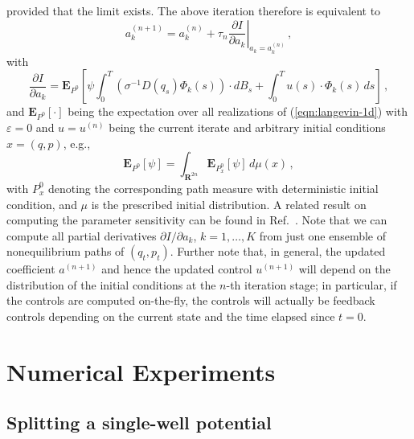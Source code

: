 \documentclass[]{tMPH2e}
\newcommand{\R}{{\mathbf R}}
\newcommand{\eps}{\varepsilon}
\newcommand{\bE}{{\mathbf E}}
\begin{document}
provided that the limit exists. The above iteration therefore is equivalent to
\begin{equation}\label{gd}
a_{k}^{(n+1)} = a_{k}^{(n)} + \tau_{n}\left.\frac{\partial I}{\partial a_{k}}\right|_{a_{k}=a_{k}^{(n)}}\,,
\end{equation}
with
\begin{equation}\label{dida}
\frac{\partial I}{\partial a_{k}} = \bE_{P^0}\left[\psi\int_{0}^{T}(\sigma^{-1}D(q_{s})\Phi_{k}(s))\cdot dB_{s} + \int_{0}^{T}u(s)\cdot\Phi_{k}(s)\,ds \right] \,,
\end{equation}
and $\bE_{P^0}[\cdot]$ being the expectation over all realizations of (\ref{eqn:langevin-1d}) with $\eps=0$ and $u=u^{(n)}$ being the current iterate and arbitrary initial conditions $x=(q,p)$, e.g., 
\[
\bE_{P^{0}}[\psi] = \int_{\R^{2n}}\bE_{P^{0}_{x}}[\psi]\,d\mu(x) \,,
\]
with $P_{x}^{0}$ denoting the corresponding path measure with deterministic initial condition, and $\mu$ is the prescribed initial distribution.
{A related result on computing the parameter sensitivity can be found
  in Ref.~\cite{warren2012malliavin}.}
Note that we can compute all partial derivatives $\partial I/\partial a_k$, $k=1,\ldots,K$ from just one ensemble of nonequilibrium paths of $(q_{t},p_{t})$. Further note that, in general, the updated coefficient $a^{(n+1)}$ and hence the updated control $u^{(n+1)}$ will depend on the distribution of the initial conditions at the $n$-th iteration stage; in particular, if the controls are computed on-the-fly, the controls will actually be feedback controls depending on the current state and the time elapsed since $t=0$.    





\section{Numerical Experiments}

\subsection{Splitting a single-well potential}
\end{document}
